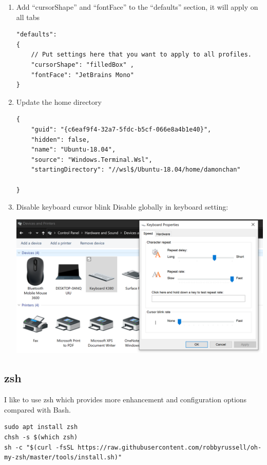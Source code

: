 \documentclass[10pt]{article}
\begin{document}
\begin{enumerate}
\item Add ``cursorShape'' and ``fontFace'' to the ``defaults'' section, it will apply on all tabs
\label{sec:org539e60d}
\begin{verbatim}
"defaults":
{
    // Put settings here that you want to apply to all profiles.
    "cursorShape": "filledBox" ,
    "fontFace": "JetBrains Mono"
}
\end{verbatim}

\item Update the home directory
\label{sec:org74b6908}
\begin{verbatim}
{
    "guid": "{c6eaf9f4-32a7-5fdc-b5cf-066e8a4b1e40}",
    "hidden": false,
    "name": "Ubuntu-18.04",
    "source": "Windows.Terminal.Wsl",
    "startingDirectory": "//wsl$/Ubuntu-18.04/home/damonchan"

}
\end{verbatim}

\item Disable keyboard cursor blink
\label{sec:org43fdb20}
Disable globally in keyboard setting:
\begin{center}
\includegraphics[width=.9\linewidth]{UnblinkCursor.png}
\end{center}
\end{enumerate}

\subsection{zsh}
\label{sec:org2d0ce78}
I like to use zsh which provides more enhancement and configuration options compared with Bash.
\begin{verbatim}
sudo apt install zsh
chsh -s $(which zsh)
sh -c "$(curl -fsSL https://raw.githubusercontent.com/robbyrussell/oh-my-zsh/master/tools/install.sh)"
\end{verbatim}
\end{document}
